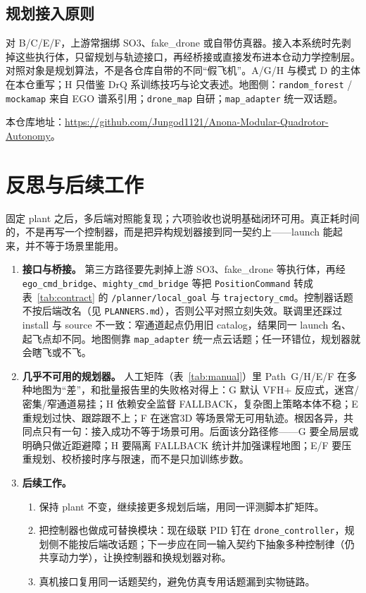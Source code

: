 \section{规划接入原则}

对 B/C/E/F，上游常捆绑 SO3、fake\_drone 或自带仿真器。接入本系统时先剥掉这些执行体，只留规划与轨迹接口，再经桥接或直接发布进本仓动力学控制层。对照对象是规划算法，不是各仓库自带的不同“假飞机”。A/G/H 与模式 D 的主体在本仓重写；H 只借鉴 DrQ 系训练技巧与论文表述。地图侧：\texttt{random\_forest} / \texttt{mockamap} 来自 EGO 谱系引用；\texttt{drone\_map} 自研；\texttt{map\_adapter} 统一双话题。

本仓库地址：\url{https://github.com/Jungod1121/Anona-Modular-Quadrotor-Autonomy}。

\chapter{反思与后续工作}

固定 plant 之后，多后端对照能复现；六项验收也说明基础闭环可用。真正耗时间的，不是再写一个控制器，而是把异构规划器接到同一契约上——launch 能起来，并不等于场景里能用。

\begin{enumerate}[leftmargin=1.6em,itemsep=0.45em,parsep=0.15em]
  \item \textbf{接口与桥接。}
  第三方路径要先剥掉上游 SO3、fake\_drone 等执行体，再经 \texttt{ego\_cmd\_bridge}、\texttt{mighty\_cmd\_bridge} 等把 \texttt{PositionCommand} 转成表~\ref{tab:contract} 的 \texttt{/planner/local\_goal} 与 \texttt{trajectory\_cmd}。控制器话题不按后端改名（见 \texttt{PLANNERS.md}），否则公平对照立刻失效。联调里还踩过 install 与 source 不一致：窄通道起点仍用旧 catalog，结果同一 launch 名、起飞点却不同。地图侧靠 \texttt{map\_adapter} 统一点云话题；任一环错位，规划器就会瞎飞或不飞。

  \item \textbf{几乎不可用的规划器。}
  人工矩阵（表~\ref{tab:manual}）里 Path~G/H/E/F 在多种地图为“差”，和批量报告里的失败格对得上：G 默认 VFH+ 反应式，迷宫/密集/窄通道易挂；H 依赖安全监督 FALLBACK，复杂图上策略本体不稳；E 重规划过快、跟踪跟不上；F 在迷宫3D 等场景常无可用轨迹。根因各异，共同点只有一句：接入成功不等于场景可用。后面该分路径修——G 要全局层或明确只做近距避障；H 要隔离 FALLBACK 统计并加强课程地图；E/F 要压重规划、校桥接时序与限速，而不是只加训练步数。

  \item \textbf{后续工作。}
  \begin{enumerate}[label=(\arabic*),leftmargin=1.8em,itemsep=0.25em,parsep=0.1em]
    \item 保持 plant 不变，继续接更多规划后端，用同一评测脚本扩矩阵。
    \item 把控制器也做成可替换模块：现在级联 PID 钉在 \texttt{drone\_controller}，规划侧不能按后端改话题；下一步应在同一输入契约下抽象多种控制律（仍共享动力学），让换控制器和换规划器对称。
    \item 真机接口复用同一话题契约，避免仿真专用话题漏到实物链路。
  \end{enumerate}
\end{enumerate}

